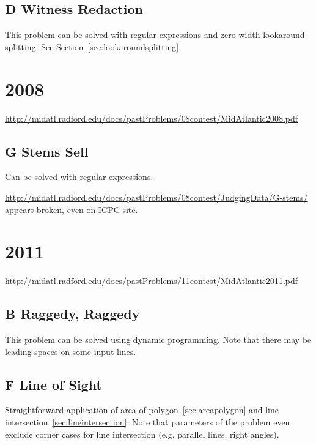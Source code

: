 \subsection{D Witness Redaction}
\label{sec:2007-d-witness}
This problem can be solved with regular expressions and zero-width lookaround splitting.
See Section~\ref{sec:lookaroundsplitting}.

\section{2008}
\href{(Problem PDF 2008)}{http://midatl.radford.edu/docs/pastProblems/08contest/MidAtlantic2008.pdf}

\subsection{G Stems Sell}
\label{sec:2008-g-stems}

Can be solved with regular expressions.

\href{Judge data}{http://midatl.radford.edu/docs/pastProblems/08contest/JudgingData/G-stems/}
appears broken, even on ICPC site.

\section{2011}

\href{(Problem PDF 2011)}{http://midatl.radford.edu/docs/pastProblems/11contest/MidAtlantic2011.pdf}

\subsection{B Raggedy, Raggedy}
\label{sec:2011-b-raggedy}

This problem can be solved using dynamic programming.
Note that there may be leading spaces on some input lines.

\subsection{F Line of Sight}
\label{sec:2011-f-lineofsight}

Straightforward application of area of polygon~\ref{sec:areapolygon} and line intersection~\ref{sec:lineintersection}.
Note that parameters of the problem even exclude corner cases for line intersection (e.g. parallel lines, right angles).

